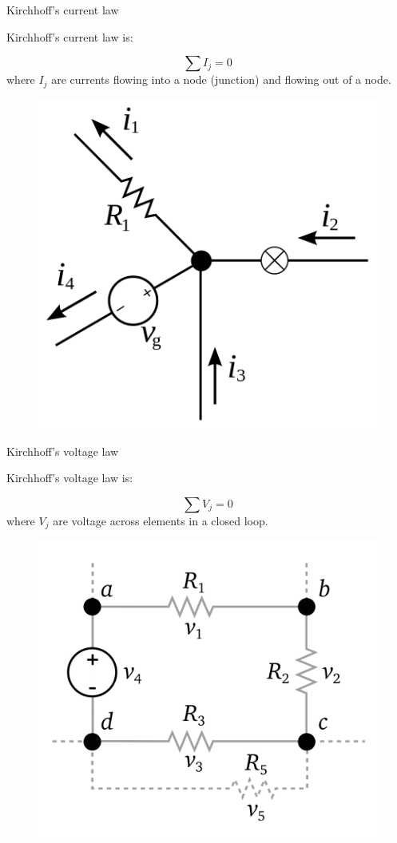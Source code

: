 \documentclass{beamer}
\begin{document}
\begin{frame}{Kirchhoff's current law}
	\begin{flushleft}
		
		Kirchhoff's current law is:
		
		\begin{equation}
			\sum I_j = 0
		\end{equation}
		where $I_j$ are currents flowing into a node (junction) and flowing out of a node.
		
		\begin{figure}
			\centering
			\includegraphics[width=0.5\linewidth]{Kirchhoff_1}
			\label{fig:kirchhoff1}
		\end{figure}
		
		
	\end{flushleft}
\end{frame}



\begin{frame}{Kirchhoff's voltage law}
	\begin{flushleft}
		
		Kirchhoff's voltage law is:
		
		\begin{equation}
			\sum V_j = 0
		\end{equation}
		where $V_j$ are voltage across elements in a closed loop.
		
		\begin{figure}
			\centering
			\includegraphics[width=0.5\linewidth]{Kirchhoff_2}
			\label{fig:kirchhoff1}
		\end{figure}
		
		
	\end{flushleft}
\end{frame}
\end{document}
